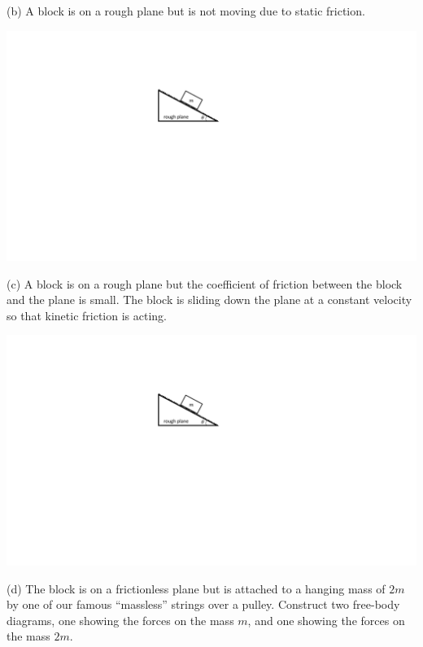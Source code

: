 (b) A block is on a rough plane but is not moving due to static friction.

\vspace{0.3cm}
{\par\centering \includegraphics{friction/rough_plane.pdf} \par}

(c) A block is on a rough plane but the coefficient of friction between the
block and the plane is small. The block is sliding down the plane at a constant
velocity so that kinetic friction is acting.

\vspace{0.3cm}
{\par\centering \includegraphics{friction/rough_plane.pdf} \par}

\pagebreak[2]
(d) The block is on a frictionless plane but is attached to a hanging mass of
$2m$ by one of our famous ``massless'' strings over a pulley.
Construct two free-body diagrams, one showing the forces on the mass $m$, and one showing the forces
on the mass $2m$.

